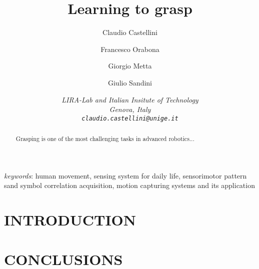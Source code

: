 \documentclass{arsubmit}
\title{Learning to grasp}
\author{Claudio Castellini \and Francesco Orabona \and Giorgio Metta \and Giulio Sandini}
\date{\small \it{
LIRA-Lab and Italian Insitute of Technology\\
Genova, Italy\\
{\tt claudio.castellini@unige.it}
}}
\begin{document}
\maketitle

\begin{abstract}

  Grasping is one of the most challenging tasks in advanced
  robotics...

\end{abstract}

{\it keywords}: human movement, sensing system for daily life,
sensorimotor pattern sand symbol correlation acquisition, motion
capturing systems and its application

\section{INTRODUCTION}
\label{sec:introduction}

\section{CONCLUSIONS}
\label{sec:Conclusions}

{\small


}
\end{document}
